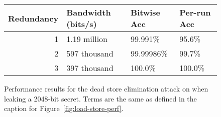 \begin{figure}
  \small
  \begin{tabular}{ r | l | l | l }
    Redundancy & Bandwidth (bits/s) & Bitwise Acc & Per-run Acc \\ \hline
    1          & 1.19 million       & 99.991\%    & 95.6\%      \\
    2          & 597 thousand       & 99.99986\%  & 99.7\%      \\
    3          & 397 thousand       & 100.0\%     & 100.0\%     \\
  \end{tabular}
  \caption{
    Performance results for the dead store elimination attack on {\CLANG} when
    leaking a 2048-bit secret.
    Terms are the same as defined in the caption for Figure~\ref{fig:load-store-perf}.
  }
  \label{fig:clang-dse-perf}
\end{figure}


